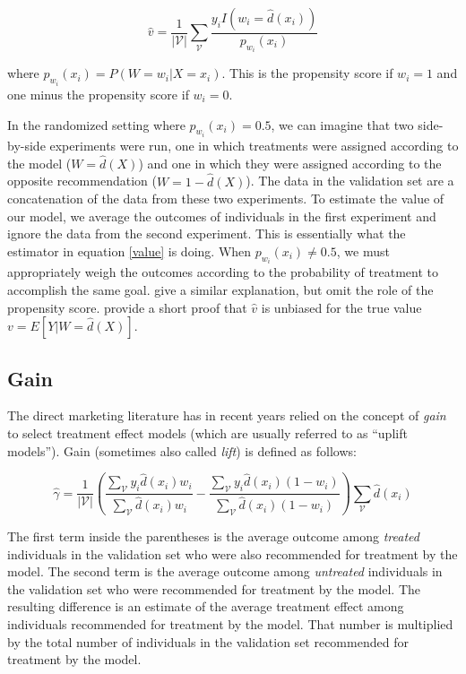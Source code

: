 \begin{equation}
\label{value}
\hat v = \frac{1}{|\mathcal{V}|}\sum_{\mathcal{V}} \frac{y_i I(w_i=\hat d(x_i))}{p_{w_i}(x_i)}
\end{equation}

where $p_{w_i}(x_i) = P(W=w_i | X=x_i)$. This is the propensity score if $w_i = 1$ and one minus the propensity score if $w_i = 0$.

In the randomized setting where $p_{w_i}(x_i) = 0.5$, we can imagine that two side-by-side experiments were run, one in which treatments were assigned according to the model ($W = \hat d(X)$) and one in which they were assigned according to the opposite recommendation ($W = 1 - \hat d(X)$). The data in the validation set are a concatenation of the data from these two experiments. To estimate the value of our model, we average the outcomes of individuals in the first experiment and ignore the data from the second experiment. This is essentially what the estimator in equation \ref{value} is doing. When $p_{w_i}(x_i) \ne 0.5$, we must appropriately weigh the outcomes according to the probability of treatment to accomplish the same goal. \citet{Kapelner:3baXYEjR} give a similar explanation, but omit the role of the propensity score. \citet{Zhao:2017wa} provide a short proof that $\hat v$ is unbiased for the true value $v = E[Y|W = \hat d(X)]$. 


\subsection{Gain}
\label{sec:gain}

The direct marketing literature has in recent years relied on the concept of \emph{gain} to select treatment effect models (which are usually referred to as ``uplift models''). Gain (sometimes also called \emph{lift}) is defined as follows:

\begin{equation}
\label{gain-basic}
	\hat \gamma = \frac{1}{|\mathcal V |} \left(
		  \frac{\sum_{\mathcal{V}} y_i  \hat d(x_i) w_i}{\sum_{\mathcal{V}}  \hat d(x_i) w_i} - 
		  \frac{\sum_{\mathcal{V}} y_i  \hat d(x_i) (1-w_i)}{\sum_{\mathcal{V}}  \hat d(x_i)  (1-w_i)} 
		  \right)
		  \sum_{\mathcal{V}} \hat d(x_i) 
\end{equation}

The first term inside the parentheses is the average outcome among \emph{treated} individuals in the validation set who were also recommended for treatment by the model. The second term is the average outcome among \emph{untreated} individuals in the validation set who were recommended for treatment by the model. The resulting difference is an estimate of the average treatment effect among individuals recommended for treatment by the model. That number is multiplied by the total number of individuals in the validation set recommended for treatment by the model. 

